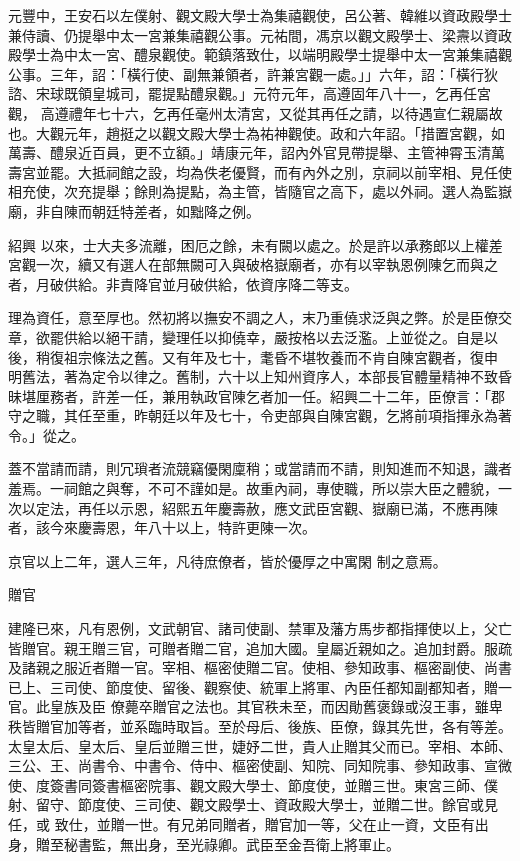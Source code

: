 \begin{pinyinscope}
 元豐中，王安石以左僕射、觀文殿大學士為集禧觀使，呂公著、韓維以資政殿學士兼侍讀、仍提舉中太一宮兼集禧觀公事。元祐間，馮京以觀文殿學士、梁燾以資政殿學士為中太一宮、醴泉觀使。範鎮落致仕，以端明殿學士提舉中太一宮兼集禧觀公事。三年，詔：「橫行使、副無兼領者，許兼宮觀一處。」」六年，詔：「橫行狄諮、宋球既領皇城司，罷提點醴泉觀。」元符元年，高遵固年八十一，乞再任宮觀，
 高遵禮年七十六，乞再任毫州太清宮，又從其再任之請，以待遇宣仁親屬故也。大觀元年，趙挺之以觀文殿大學士為祐神觀使。政和六年詔。「措置宮觀，如萬壽、醴泉近百員，更不立額。」靖康元年，詔內外官見帶提舉、主管神霄玉清萬壽宮並罷。大抵祠館之設，均為佚老優賢，而有內外之別，京祠以前宰相、見任使相充使，次充提舉；餘則為提點，為主管，皆隨官之高下，處以外祠。選人為監嶽廟，非自陳而朝廷特差者，如黜降之例。



 紹興
 以來，士大夫多流離，困厄之餘，未有闕以處之。於是許以承務郎以上權差宮觀一次，續又有選人在部無闕可入與破格嶽廟者，亦有以宰執恩例陳乞而與之者，月破供給。非責降官並月破供給，依資序降二等支。



 理為資任，意至厚也。然初將以撫安不調之人，末乃重僥求泛與之弊。於是臣僚交章，欲罷供給以絕干請，變理任以抑僥幸，嚴按格以去泛濫。上並從之。自是以後，稍復祖宗條法之舊。又有年及七十，耄昏不堪牧養而不肯自陳宮觀者，復申
 明舊法，著為定令以律之。舊制，六十以上知州資序人，本部長官體量精神不致昏昧堪厘務者，許差一任，兼用執政官陳乞者加一任。紹興二十二年，臣僚言：「郡守之職，其任至重，昨朝廷以年及七十，令吏部與自陳宮觀，乞將前項指揮永為著令。」從之。



 蓋不當請而請，則冗瑣者流競竊優閑廩稍；或當請而不請，則知進而不知退，識者羞焉。一祠館之與奪，不可不謹如是。故重內祠，專使職，所以崇大臣之體貌，一次以定法，再任以示恩，紹熙五年慶壽赦，應文武臣宮觀、嶽廟已滿，不應再陳者，該今來慶壽恩，年八十以上，特許更陳一次。



 京官以上二年，選人三年，凡待庶僚者，皆於優厚之中寓閑
 制之意焉。



 贈官



 建隆已來，凡有恩例，文武朝官、諸司使副、禁軍及藩方馬步都指揮使以上，父亡皆贈官。親王贈三官，可贈者贈二官，追加大國。皇屬近親如之。追加封爵。服疏及諸親之服近者贈一官。宰相、樞密使贈二官。使相、參知政事、樞密副使、尚書已上、三司使、節度使、留後、觀察使、統軍上將軍、內臣任都知副都知者，贈一官。此皇族及臣
 僚薨卒贈官之法也。其官秩未至，而因勛舊褒錄或沒王事，雖卑秩皆贈官加等者，並系臨時取旨。至於母后、後族、臣僚，錄其先世，各有等差。太皇太后、皇太后、皇后並贈三世，婕妤二世，貴人止贈其父而已。宰相、本師、三公、王、尚書令、中書令、侍中、樞密使副、知院、同知院事、參知政事、宣微使、度簽書同簽書樞密院事、觀文殿大學士、節度使，並贈三世。東宮三師、僕射、留守、節度使、三司使、觀文殿學士、資政殿大學士，並贈二世。餘官或見任，或
 致仕，並贈一世。有兄弟同贈者，贈官加一等，父在止一資，文臣有出身，贈至秘書監，無出身，至光祿卿。武臣至金吾衛上將軍止。




\end{pinyinscope}
